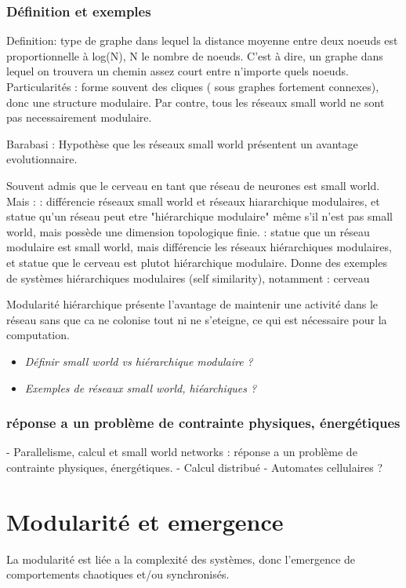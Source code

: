 \subsubsection{Définition et exemples}
Definition: type de graphe dans lequel la distance moyenne entre deux noeuds est proportionnelle à log(N), N le nombre de noeuds. C'est à dire, un graphe dans lequel on trouvera un chemin assez court entre n'importe quels noeuds. 
Particularités : forme souvent des cliques ( sous graphes fortement connexes), donc une structure modulaire. Par contre, tous les réseaux small world ne sont pas necessairement modulaire. 

Barabasi : Hypothèse que les réseaux small world présentent un avantage evolutionnaire.

Souvent admis que le cerveau en tant que réseau de neurones est small world. 
Mais : 
\cite{Hilgetag2015IsTB} : différencie réseaux small world et réseaux hiararchique modulaires, et statue qu'un réseau peut etre "hiérarchique modulaire" même s'il n'est pas small world, mais possède une dimension topologique finie. 
\cite{Meunier2010ModularAH} : statue que un réseau modulaire est small world, mais différencie les réseaux hiérarchiques modulaires, et statue que le cerveau est plutot hiérarchique modulaire. Donne des exemples de systèmes hiérarchiques modulaires (self similarity), notamment : cerveau 

Modularité hiérarchique présente l'avantage de maintenir une activité dans le réseau sans que ca ne colonise tout ni ne s'eteigne, ce qui est nécessaire pour la computation. 

\begin{itemize}
\item\textit{Définir small world vs hiérarchique modulaire ? }
\item\textit{Exemples de réseaux small world, hiéarchiques ? }
\end{itemize}

 
\subsubsection{réponse a un problème de contrainte physiques, énergétiques}

- Parallelisme, calcul et small world networks : réponse a un problème de contrainte physiques, énergétiques. 
- Calcul distribué 
- Automates cellulaires  ?
\section{Modularité et emergence}
La modularité est liée a la complexité des systèmes, donc l'emergence de comportements chaotiques et/ou synchronisés. 
